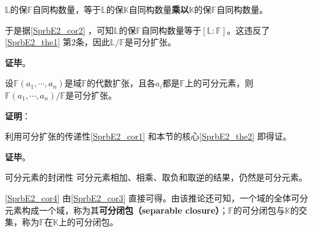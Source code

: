 $\mathbb{L}$的保$\mathbb{F}$自同构数量，等于$\mathbb{L}$的保$\mathbb{K}$自同构数量\textbf{乘以}$\mathbb{K}$的保$\mathbb{F}$自同构数量。

于是据\autoref{SprbE2_cor2} ，可知$\mathbb{L}$的保$\mathbb{F}$自同构数量等于$[\mathbb{L}:\mathbb{F}]$。这违反了\autoref{SprbE2_the1} 第$2$条，因此$\mathbb{L}/\mathbb{F}$是可分扩张。




\textbf{证毕}。





\begin{corollary}{}\label{SprbE2_cor3}
设$\mathbb{F}(a_1, \cdots, a_n)$是域$\mathbb{F}$的代数扩张，且各$a_i$都是$\mathbb{F}$上的可分元素，则$\mathbb{F}(a_1, \cdots, a_n)/\mathbb{F}$是可分扩张。
\end{corollary}

\textbf{证明}：

利用可分扩张的传递性\autoref{SprbE2_cor1} 和本节的核心\autoref{SprbE2_the2} 即得证。

\textbf{证毕}。





\begin{corollary}{可分元素的封闭性}\label{SprbE2_cor4}
可分元素相加、相乘、取负和取逆的结果，仍然是可分元素。
\end{corollary}

\autoref{SprbE2_cor4} 由\autoref{SprbE2_cor3} 直接可得。由该推论还可知，一个域的全体可分元素构成一个域，称为其\textbf{可分闭包（separable closure）}；$\mathbb{F}$的可分闭包与$\mathbb{K}$的交集，称为$\mathbb{F}$在$\mathbb{K}$上的可分闭包。











